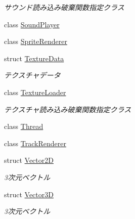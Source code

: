 \begin{DoxyCompactItemize}
\begin{DoxyCompactList}\small\item\em サウンド読み込み破棄関数指定クラス \end{DoxyCompactList}\item 
class \mbox{\hyperlink{class_effekseer_1_1_sound_player}{Sound\+Player}}
\item 
class \mbox{\hyperlink{class_effekseer_1_1_sprite_renderer}{Sprite\+Renderer}}
\item 
struct \mbox{\hyperlink{struct_effekseer_1_1_texture_data}{Texture\+Data}}
\begin{DoxyCompactList}\small\item\em テクスチャデータ \end{DoxyCompactList}\item 
class \mbox{\hyperlink{class_effekseer_1_1_texture_loader}{Texture\+Loader}}
\begin{DoxyCompactList}\small\item\em テクスチャ読み込み破棄関数指定クラス \end{DoxyCompactList}\item 
class \mbox{\hyperlink{class_effekseer_1_1_thread}{Thread}}
\item 
class \mbox{\hyperlink{class_effekseer_1_1_track_renderer}{Track\+Renderer}}
\item 
struct \mbox{\hyperlink{struct_effekseer_1_1_vector2_d}{Vector2D}}
\begin{DoxyCompactList}\small\item\em 3次元ベクトル \end{DoxyCompactList}\item 
struct \mbox{\hyperlink{struct_effekseer_1_1_vector3_d}{Vector3D}}
\begin{DoxyCompactList}\small\item\em 3次元ベクトル \end{DoxyCompactList}\end{DoxyCompactItemize}
